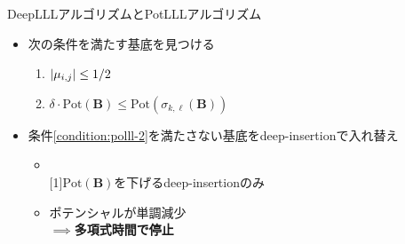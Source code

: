 \documentclass[12pt,aspectratio=169,xcolor=dvipsnames,table,dvipdfmx, leqno]{beamer}
\begin{document}
\begin{frame}{DeepLLLアルゴリズムとPotLLLアルゴリズム}
\begin{minipage}[b]{0.45\columnwidth}
\begin{itemize}
        \item 次の条件を満たす基底を見つける
        \begin{enumerate}
            \item $\abs{\mu_{i, j}}\le 1/2$
            \item $\delta\cdot \mathrm{Pot}(\bm{B})\le\mathrm{Pot}(\sigma_{k, \ell}(\bm{B}))$\label{condition:polll-2}
        \end{enumerate}
        \item 条件\ref{condition:polll-2}を満たさない基底をdeep-insertionで入れ替え
        \begin{itemize}
            \item \mbox{}\\
            \vspace{-13pt}
            \scalebox{0.9}[1]{$\mathrm{Pot}(\bm{B})$を下げるdeep-insertionのみ}
            \item ポテンシャルが単調減少\\
            $\implies$\alert{\textbf{多項式時間で停止}}
        \end{itemize}
    \end{itemize}
    \mbox{}
\end{minipage}
\end{frame}
\end{document}
